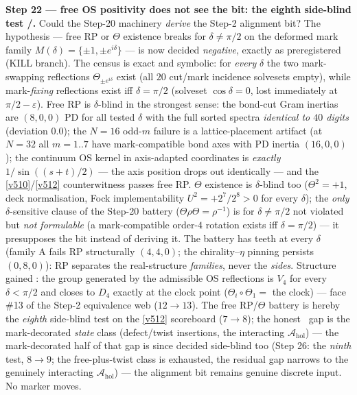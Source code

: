 \par\smallskip\noindent\textbf{Step 22 --- free OS positivity does not see the bit: the eighth
side-blind test \mE/\mC.} Could the Step-20 machinery \emph{derive} the Step-2 alignment bit?
The hypothesis --- free RP or $\Theta$ existence breaks for $\delta\neq\pi/2$ on the deformed
mark family $M(\delta)=\{\pm1,\pm e^{i\delta}\}$ --- is now decided \emph{negative}, exactly as
preregistered (KILL branch). The census is exact and symbolic: for \emph{every} $\delta$ the two
mark-swapping reflections $\Theta_{\pm e^{i\delta}}$ exist (all $20$ cut/mark incidence
solvesets empty), while mark-\emph{fixing} reflections exist iff $\delta=\pi/2$ (solveset
$\cos\delta=0$, lost immediately at $\pi/2-\varepsilon$). Free RP is $\delta$-blind in the
strongest sense: the bond-cut Gram inertias are $(8,0,0)$ PD for all tested $\delta$ with the
full sorted spectra \emph{identical to $40$ digits} (deviation $0.0$); the $N=16$ odd-$m$
failure is a lattice-placement artifact (at $N=32$ all $m=1..7$ have mark-compatible bond axes
with PD inertia $(16,0,0)$); the continuum OS kernel in axis-adapted coordinates is
\emph{exactly} $1/\sin((s{+}t)/2)$ --- the axis position drops out identically --- and the
\vref{v510}/\vref{v512} counterwitness passes free RP. $\Theta$ existence is $\delta$-blind too
($\Theta^2=+1$, deck normalisation, Fock implementability $U^2=+2^7/2^8>0$ for every $\delta$);
the \emph{only} $\delta$-sensitive clause of the Step-20 battery ($\Theta\rho\Theta=\rho^{-1}$)
is for $\delta\neq\pi/2$ not violated but \emph{not formulable} (a mark-compatible order-$4$
rotation exists iff $\delta=\pi/2$) --- it presupposes the bit instead of deriving it. The
battery has teeth at every $\delta$ (family A fails RP structurally $(4,4,0)$; the
chirality--$\eta$ pinning persists $(0,8,0)$): RP separates the real-structure \emph{families},
never the \emph{sides}. Structure gained \mC: the group generated by the admissible OS
reflections is $V_4$ for every $\delta<\pi/2$ and closes to $D_4$ exactly at the clock point
($\Theta_i\circ\Theta_1=$ the clock) --- face \#13 of the Step-2 equivalence web ($12\to13$).
The free RP/$\Theta$ battery is hereby the \emph{eighth} side-blind test on the \vref{v512}
scoreboard ($7\to8$); the honest \mO\ gap is the mark-decorated \emph{state} class
(defect/twist insertions, the interacting $\mathcal A_{\mathrm{hol}}$) --- the mark-decorated
half of that gap is since decided side-blind too (Step 26: the \emph{ninth} test, $8\to9$;
the free-plus-twist class is exhausted, the residual gap narrows to the genuinely interacting
$\mathcal A_{\mathrm{hol}}$) --- the alignment bit
remains genuine discrete input. No marker moves.


